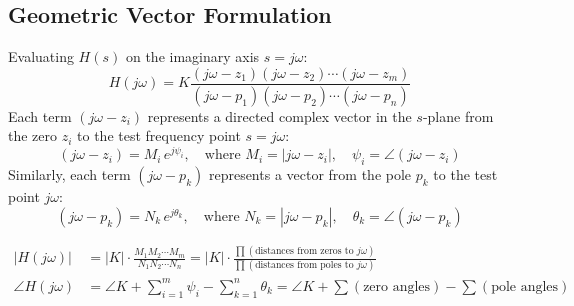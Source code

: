 \documentclass[12pt,a4paper]{article}
\begin{document}
\subsection{Geometric Vector Formulation}

Evaluating $H(s)$ on the imaginary axis $s = j\omega$:
\begin{equation}
  H(j\omega) = K \frac{(j\omega - z_1)(j\omega - z_2)\cdots(j\omega - z_m)}{(j\omega - p_1)(j\omega - p_2)\cdots(j\omega - p_n)}
\end{equation}
Each term $(j\omega - z_i)$ represents a directed complex vector in the $s$-plane from the zero $z_i$ to the test frequency point $s = j\omega$:
\begin{equation}
  (j\omega - z_i) = M_i\,e^{j\psi_i}, \quad \text{where } M_i = |j\omega - z_i|, \quad \psi_i = \angle(j\omega - z_i)
\end{equation}
Similarly, each term $(j\omega - p_k)$ represents a vector from the pole $p_k$ to the test point $j\omega$:
\begin{equation}
  (j\omega - p_k) = N_k\,e^{j\theta_k}, \quad \text{where } N_k = |j\omega - p_k|, \quad \theta_k = \angle(j\omega - p_k)
\end{equation}

\begin{tcolorbox}[formulabox, title={\textbf{Magnitude and Phase Computation via Pole-Zero Geometry}}]
\begin{align}
  |H(j\omega)| &= |K| \cdot \frac{M_1 M_2 \cdots M_m}{N_1 N_2 \cdots N_n} = |K| \cdot \frac{\prod (\text{distances from zeros to } j\omega)}{\prod (\text{distances from poles to } j\omega)} \\[5pt]
  \angle H(j\omega) &= \angle K + \sum_{i=1}^m \psi_i - \sum_{k=1}^n \theta_k = \angle K + \sum(\text{zero angles}) - \sum(\text{pole angles})
\end{align}
\end{tcolorbox}
\end{document}
